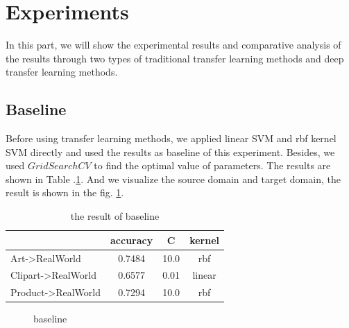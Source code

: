 \documentclass[conference]{IEEEtran}
\begin{document}
\section{Experiments}

In this part, we will show the experimental results and comparative analysis of the results through two types of traditional transfer learning methods and deep transfer learning methods.


\subsection{Baseline}
Before using transfer learning methods, we applied linear SVM and rbf kernel SVM directly and used the results as baseline of this experiment. Besides, we used $GridSearchCV$ to find the optimal value of parameters. The results are shown in Table .\ref{tab:base}. And we visualize the source domain and target domain, the result is shown in the fig. \ref{fig:base}.

\begin{table}[htbp]
	\centering
	\caption{the result of baseline}
\begin{tabular}{|l|c|c|c|}
	\hline
	\diagbox{dataset}{result} & accuracy & C & kernel \\
	\hline
	Art->RealWorld & 0.7484  & 10.0 & rbf \\
	\hline
	Clipart->RealWorld & 0.6577 & 0.01 & linear \\
	\hline
	Product->RealWorld & 0.7294 & 10.0 & rbf \\
	\hline
\end{tabular}\label{tab:base}
\end{table}

\begin{center}
	\begin{figure}[htbp]
		\centering
		\quad
		\quad
		\caption{baseline}
		\label{fig:base}
	\end{figure}
\end{center}
\end{document}

